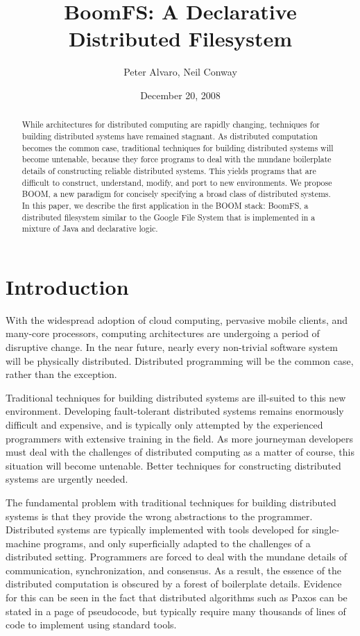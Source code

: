 \documentclass{article}
\title{BoomFS: A Declarative Distributed Filesystem}
\author{Peter Alvaro, Neil Conway}
\date{December 20, 2008}
\begin{document}
\maketitle
\begin{abstract}
  While architectures for distributed computing are rapidly changing,
  techniques for building distributed systems have remained
  stagnant. As distributed computation becomes the common case,
  traditional techniques for building distributed systems will become
  untenable, because they force programs to deal with the mundane
  boilerplate details of constructing reliable distributed
  systems. This yields programs that are difficult to construct,
  understand, modify, and port to new environments. We propose BOOM, a
  new paradigm for concisely specifying a broad class of distributed
  systems. In this paper, we describe the first application in the
  BOOM stack: BoomFS, a distributed filesystem similar to the Google
  File System\cite{gfs} that is implemented in a mixture of Java and
  declarative logic.
\end{abstract}

\section{Introduction}

With the widespread adoption of cloud computing, pervasive mobile
clients, and many-core processors, computing architectures are
undergoing a period of disruptive change. In the near future, nearly
every non-trivial software system will be physically
distributed. Distributed programming will be the common case, rather
than the exception.

Traditional techniques for building distributed systems are ill-suited
to this new environment. Developing fault-tolerant distributed systems
remains enormously difficult and expensive, and is typically only
attempted by the experienced programmers with extensive training in
the field. As more journeyman developers must deal with the challenges
of distributed computing as a matter of course, this situation will
become untenable. Better techniques for constructing distributed
systems are urgently needed.

The fundamental problem with traditional techniques for building
distributed systems is that they provide the wrong abstractions to the
programmer. Distributed systems are typically implemented with tools
developed for single-machine programs, and only superficially adapted
to the challenges of a distributed setting. Programmers are forced to
deal with the mundane details of communication, synchronization, and
consensus. As a result, the essence of the distributed computation is
obscured by a forest of boilerplate details. Evidence for this can be
seen in the fact that distributed algorithms such as Paxos can be
stated in a page of pseudocode, but typically require many thousands
of lines of code to implement using standard
tools\cite{paxosmadelive}.
\end{document}

